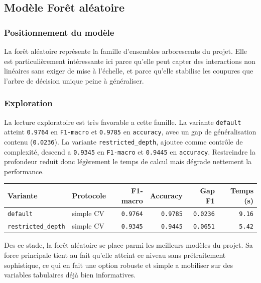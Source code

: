 \subsection{Modèle Forêt aléatoire}

\subsubsection{Positionnement du modèle}
La forêt aléatoire représente la famille d'ensembles arborescents du projet. Elle est particulièrement intéressante ici parce qu'elle peut capter des interactions non linéaires sans exiger de mise à l'échelle, et parce qu'elle stabilise les coupures que l'arbre de décision unique peine à généraliser.

\subsubsection{Exploration}
La lecture exploratoire est très favorable a cette famille. La variante \texttt{default} atteint \texttt{0.9764} en \texttt{F1-macro} et \texttt{0.9785} en \texttt{accuracy}, avec un gap de généralisation contenu (\texttt{0.0236}). La variante \texttt{restricted\_depth}, ajoutee comme contrôle de complexité, descend a \texttt{0.9345} en \texttt{F1-macro} et \texttt{0.9445} en \texttt{accuracy}. Restreindre la profondeur reduit donc légèrement le temps de calcul mais dégrade nettement la performance.

\begin{table}[H]
\centering
\begin{tabular}{|l|l|r|r|r|r|}
\hline
\textbf{Variante} & \textbf{Protocole} & \textbf{F1-macro} & \textbf{Accuracy} & \textbf{Gap F1} & \textbf{Temps (s)} \\
\hline
\texttt{default} & simple CV & \texttt{0.9764} & \texttt{0.9785} & \texttt{0.0236} & \texttt{9.16} \\
\texttt{restricted\_depth} & simple CV & \texttt{0.9345} & \texttt{0.9445} & \texttt{0.0651} & \texttt{5.42} \\
\hline
\end{tabular}
\end{table}

Des ce stade, la forêt aléatoire se place parmi les meilleurs modèles du projet. Sa force principale tient au fait qu'elle atteint ce niveau sans prétraitement sophistique, ce qui en fait une option robuste et simple a mobiliser sur des variables tabulaires déjà bien informatives.

